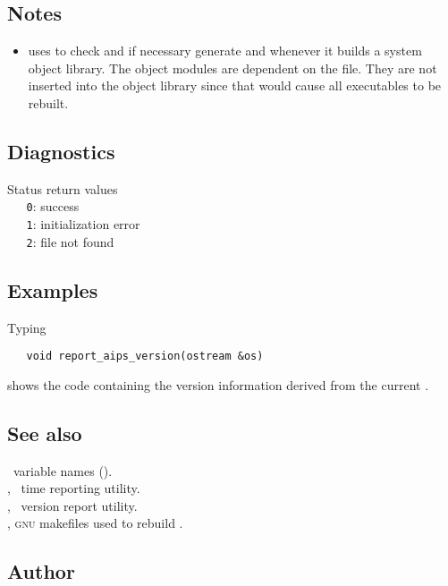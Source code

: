 \subsection*{Notes}
 
\begin{itemize}
\item
    uses  to check and if necessary generate
    and  whenever it
   builds a system object library.  The  object modules are
   dependent on the  file.  They are not inserted
   into the object library since that would cause all executables to be
   rebuilt.
\end{itemize}
 
\subsection*{Diagnostics}
 
Status return values
\\ \verb+   0+: success
\\ \verb+   1+: initialization error
\\ \verb+   2+:  file not found
 
\subsection*{Examples}
 
Typing

\begin{verbatim}
   void report_aips_version(ostream &os)
\end{verbatim}

\noindent
shows the code containing the version information derived from the current
.
 
\subsection*{See also}
 
\aipspp\ variable names ().\\
, \aipspp\ time reporting utility.\\
, \aipspp\ version report utility.\\
, \textsc{gnu} makefiles used to rebuild \aipspp.
 
\subsection*{Author}
 
